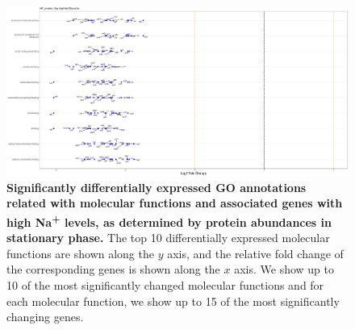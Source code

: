 \documentclass[a4paper]{article}
\begin{document}
\begin{figure}[!htb]
	\includegraphics[width=1.0\textwidth]{../../d_figures/MF16_protein_Sta_highNaVSbaseNa_withTitle.pdf}
	\caption[Significantly differentially expressed GO annotations associated with molecular functions for protein samples in stationary phase tested for high Na\textsuperscript{+} levels against base Na\textsuperscript{+} levels]
	{\textbf{Significantly differentially expressed GO annotations related with molecular functions and associated genes with high Na\textsuperscript{+} levels, as determined by protein abundances in stationary phase.} The top 10 differentially expressed molecular functions are shown along the $y$ axis, and the relative fold change of the corresponding genes is shown along the $x$ axis. We show up to 10 of the most significantly changed molecular functions and for each molecular function, we show up to 15 of the most significantly changing genes.}
\end{figure}
\end{document}
